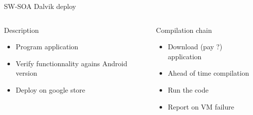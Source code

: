 %
\begin{Frame}{SW-SOA Dalvik deploy}
  \begin{columns}[t]
    \begin{column}{5cm} %
      \begin{block}{Description}
        \begin{itemize}
        \item Program application
        \item Verify functionnality agains Android version
        \item Deploy on google store
        \end{itemize}
      \end{block} 
    \end{column}
    
    \begin{column}{5cm} %
      \begin{block}{Compilation chain}
        \begin{itemize}
        \item Download (pay ?) application
        \item Ahead of time compilation
        \item Run the code
        \item Report on VM failure
        \end{itemize}
      \end{block}   
    \end{column}
  \end{columns}  

\end{Frame}


